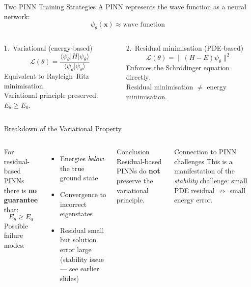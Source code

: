 \documentclass[aspectratio=169,10pt]{beamer}
\begin{document}
\begin{frame}{Two PINN Training Strategies}
  A PINN represents the wave function as a neural network:
  \[
    \psi_\theta(\mathbf{x}) \approx \text{wave function}
  \]

  \vspace{0.3cm}
  \begin{columns}[T]
      \begin{block}{1.\ Variational (energy-based)}
        \[
          \mathcal{L}(\theta)
          = \frac{\langle\psi_\theta|H|\psi_\theta\rangle}
                 {\langle\psi_\theta|\psi_\theta\rangle}
        \]
        Equivalent to Rayleigh--Ritz minimisation.\\
        \alert{Variational principle preserved:}
        $E_\theta \geq E_0$.
      \end{block}
      \begin{alertblock}{2.\ Residual minimisation (PDE-based)}
        \[
          \mathcal{L}(\theta)
          = \bigl\|(H-E)\psi_\theta\bigr\|^2
        \]
        Enforces the Schrödinger equation directly.\\
        Residual minimisation $\neq$ energy minimisation.
      \end{alertblock}
  \end{columns}
\end{frame}

\begin{frame}{Breakdown of the Variational Property}
  \begin{columns}[T]
      For residual-based PINNs there is \textbf{no guarantee} that:
      \[
        E_\theta \geq E_0
      \]
      Possible failure modes:
      \begin{itemize}
        \item Energies \emph{below} the true ground state
        \item Convergence to incorrect eigenstates
        \item Residual small but solution error large
              (stability issue — see earlier slides)
      \end{itemize}
      \begin{alertblock}{Conclusion}
        Residual-based PINNs do \textbf{not} preserve the variational
        principle.
      \end{alertblock}
      \vspace{0.3cm}
      \begin{block}{Connection to PINN challenges}
        This is a manifestation of the \emph{stability} challenge:
        small PDE residual $\not\Rightarrow$ small energy error.
      \end{block}
  \end{columns}
\end{frame}
\end{document}
